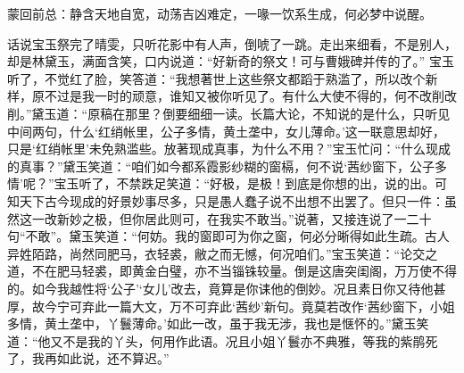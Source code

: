 
\begin{parag}
    \begin{note}蒙回前总：静含天地自宽，动荡吉凶难定，一喙一饮系生成，何必梦中说醒。\end{note}
\end{parag}


\begin{parag}
    话说宝玉祭完了晴雯，只听花影中有人声，倒唬了一跳。走出来细看，不是别人，却是林黛玉，满面含笑，口内说道：“好新奇的祭文！可与曹娥碑并传的了。” 宝玉听了，不觉红了脸，笑答道：“我想著世上这些祭文都蹈于熟滥了，所以改个新样，原不过是我一时的顽意，谁知又被你听见了。有什么大使不得的，何不改削改削。”黛玉道：“原稿在那里？倒要细细一读。长篇大论，不知说的是什么，只听见中间两句，什么‘红绡帐里，公子多情，黄土垄中，女儿薄命。’这一联意思却好，只是‘红绡帐里’未免熟滥些。放著现成真事，为什么不用？”宝玉忙问：“什么现成的真事？”黛玉笑道：“咱们如今都系霞影纱糊的窗槅，何不说‘茜纱窗下，公子多情’呢？”宝玉听了，不禁跌足笑道：“好极，是极！到底是你想的出，说的出。可知天下古今现成的好景妙事尽多，只是愚人蠢子说不出想不出罢了。但只一件：虽然这一改新妙之极，但你居此则可，在我实不敢当。”说著，又接连说了一二十句“不敢”。黛玉笑道：“何妨。我的窗即可为你之窗，何必分晰得如此生疏。古人异姓陌路，尚然同肥马，衣轻裘，敝之而无憾，何况咱们。”宝玉笑道：“论交之道，不在肥马轻裘，即黄金白璧，亦不当锱铢较量。倒是这唐突闺阁，万万使不得的。如今我越性将‘公子’‘女儿’改去，竟算是你诔他的倒妙。况且素日你又待他甚厚，故今宁可弃此一篇大文，万不可弃此‘茜纱’新句。竟莫若改作‘茜纱窗下，小姐多情，黄土垄中，丫鬟薄命。’如此一改，虽于我无涉，我也是惬怀的。”黛玉笑道：“他又不是我的丫头，何用作此语。况且小姐丫鬟亦不典雅，等我的紫鹃死了，我再如此说，还不算迟。”\
\end{parag}
